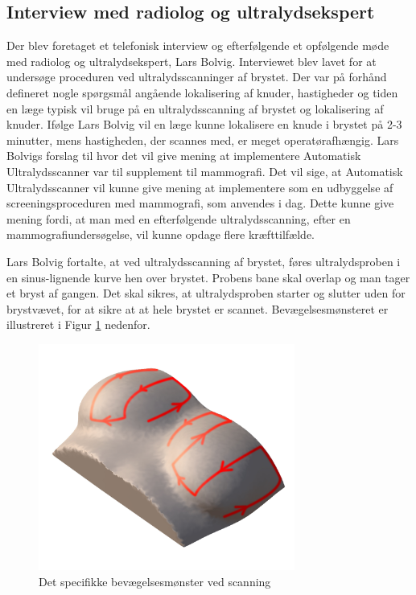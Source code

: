 \subsection{Interview med radiolog og ultralydsekspert}
Der blev foretaget et telefonisk interview og efterfølgende et opfølgende møde med radiolog og ultralydsekspert, Lars Bolvig. Interviewet blev lavet for at undersøge proceduren ved ultralydsscanninger af brystet. Der var på forhånd defineret nogle spørgsmål angående lokalisering af knuder, hastigheder og tiden en læge typisk vil bruge på en ultralydsscanning af brystet og lokalisering af knuder. Ifølge Lars Bolvig vil en læge kunne lokalisere en knude i brystet på 2-3 minutter, mens hastigheden, der scannes med, er meget operatørafhængig. Lars Bolvigs forslag til hvor det vil give mening at implementere Automatisk Ultralydsscanner var til supplement til mammografi. Det vil sige, at Automatisk Ultralydsscanner vil kunne give mening at implementere som en udbyggelse af screeningsproceduren med mammografi, som anvendes i dag. Dette kunne give mening fordi, at man med en efterfølgende ultralydsscanning, efter en mammografiundersøgelse, vil kunne opdage flere kræfttilfælde. 

Lars Bolvig fortalte, at ved ultralydsscanning af brystet, føres ultralydsproben i en sinus-lignende kurve hen over brystet. Probens bane skal overlap og man tager et bryst af gangen. Det skal sikres, at ultralydsproben starter og slutter uden for brystvævet, for at sikre at at hele brystet er scannet. Bevægelsesmønsteret er illustreret i Figur \ref{Probensbevagelse} nedenfor. 

\begin{figure}[H]
    \centering
    \includegraphics[width=0.75\textwidth]{figurer/d/probebevagelse}
    \caption{Det specifikke bevægelsesmønster ved scanning}
    \label{Probensbevagelse}
\end{figure}

